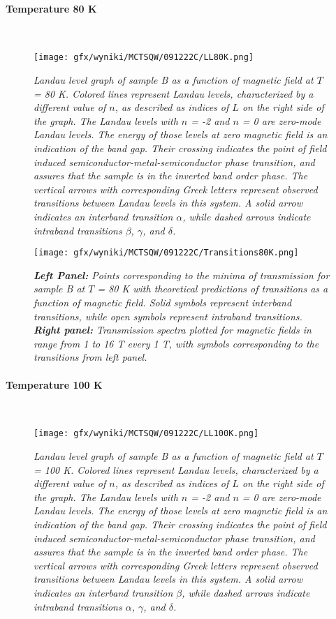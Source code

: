 \documentclass[titlepage,a4paper]{book}
\newcommand{\wciecie}{\quad\phantom{v}}
\newcommand{\myparagraph}[1]{\paragraph{#1}\mbox{}\\}
\begin{document}
\clearpage
\myparagraph{Temperature 80 K}
\wciecie
\begin{figure}[H]
	\centering
	\texttt{[image: gfx/wyniki/MCTSQW/091222C/LL80K.png]}
	\vspace{-10pt}
	\caption{\textit{Landau level graph of sample B as a function of magnetic field at $T$ = 80 K. Colored lines represent Landau levels, characterized by a different value of $n$, as described as indices of $L$ on the right side of the graph. The Landau levels with $n$ = -2 and $n$ = 0 are zero-mode Landau levels. The energy of those levels at zero magnetic field is an indication of the band gap. Their crossing indicates the point of field induced semiconductor-metal-semiconductor phase transition, and assures that the sample is in the inverted band order phase. The vertical arrows with corresponding Greek letters represent observed transitions between Landau levels in this system. A solid arrow indicates an interband transition $\alpha$, while dashed arrows indicate intraband transitions $\beta$, $\gamma$, and $\delta$.}}
	\label{fig:LL_SQW_80K}
\end{figure}

\begin{figure}[H]
	\centering
	\texttt{[image: gfx/wyniki/MCTSQW/091222C/Transitions80K.png]}
	\vspace{-10pt}
	\caption{\textit{\textbf{Left Panel:} Points corresponding to the minima of transmission for sample B at $T$ = 80 K with theoretical predictions of transitions as a function of magnetic field. Solid symbols represent interband transitions, while open symbols represent intraband transitions. \textbf{Right panel:} Transmission spectra plotted for magnetic fields in range from 1 to 16 T every 1 T, with symbols corresponding to the transitions from left panel.}}
	\label{fig:Summary_SQW_80K}
\end{figure}


\clearpage
\myparagraph{Temperature 100 K}
\wciecie
\begin{figure}[H]
	\centering
	\texttt{[image: gfx/wyniki/MCTSQW/091222C/LL100K.png]}
	\vspace{-10pt}
	\caption{\textit{Landau level graph of sample B as a function of magnetic field at $T$ = 100 K. Colored lines represent Landau levels, characterized by a different value of $n$, as described as indices of $L$ on the right side of the graph. The Landau levels with $n$ = -2 and $n$ = 0 are zero-mode Landau levels. The energy of those levels at zero magnetic field is an indication of the band gap. Their crossing indicates the point of field induced semiconductor-metal-semiconductor phase transition, and assures that the sample is in the inverted band order phase. The vertical arrows with corresponding Greek letters represent observed transitions between Landau levels in this system. A solid arrow indicates an interband transition $\beta$, while dashed arrows indicate intraband transitions $\alpha$, $\gamma$, and $\delta$.}}
	\label{fig:LL_SQW_100K}
\end{figure}
\end{document}
